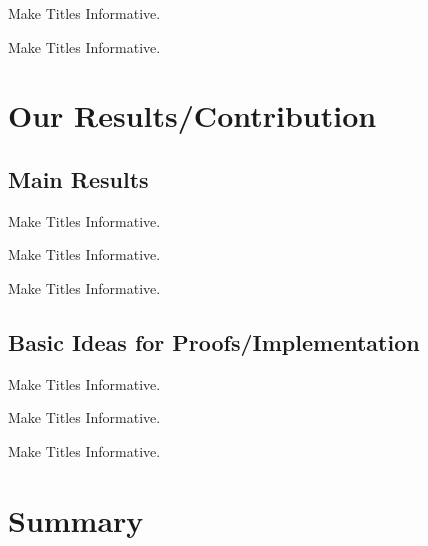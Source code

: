 \documentclass{beamer}
\begin{document}
\begin{frame}{Make Titles Informative.}
\end{frame}

\begin{frame}{Make Titles Informative.}
\end{frame}



\section{Our Results/Contribution}

\subsection{Main Results}

\begin{frame}{Make Titles Informative.}
\end{frame}

\begin{frame}{Make Titles Informative.}
\end{frame}

\begin{frame}{Make Titles Informative.}
\end{frame}


\subsection{Basic Ideas for Proofs/Implementation}

\begin{frame}{Make Titles Informative.}
\end{frame}

\begin{frame}{Make Titles Informative.}
\end{frame}

\begin{frame}{Make Titles Informative.}
\end{frame}



\section*{Summary}
\end{document}

